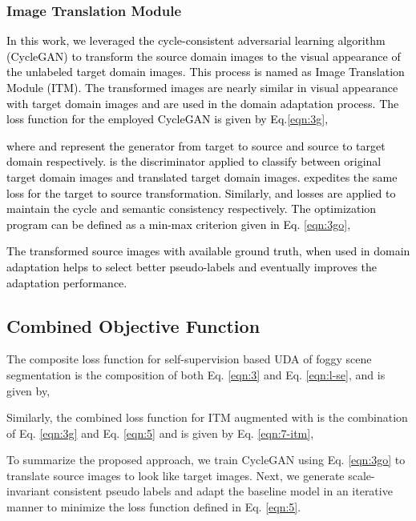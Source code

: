 \documentclass[final,5p,times,twocolumn]{elsarticle}
\begin{document}
\subsubsection{Image Translation Module}
\textcolor{black}{
In this work, we leveraged the cycle-consistent adversarial learning algorithm (CycleGAN) \cite{hoffman2017cycada} to transform the source domain images to the visual appearance of the unlabeled target domain images. This process is named as Image Translation Module (ITM). The transformed images are nearly similar in visual appearance with target domain images and are used in the domain adaptation process. 
The loss function for the employed CycleGAN is given by Eq.\ref{eqn:3g},

where  and  represent the generator from target to source and source to target domain respectively.  is the discriminator applied to classify between original target domain images and translated target domain images.  expedites the same loss for the target to source transformation. Similarly,  and  losses are applied to maintain the cycle and semantic consistency respectively. The optimization program can be defined as a min-max criterion given in Eq. \ref{eqn:3go},

The transformed source images with available ground truth, when used in domain adaptation helps to select better pseudo-labels and eventually improves the adaptation performance.}
\subsection{Combined Objective Function}

The composite loss function for self-supervision based UDA of foggy scene segmentation is the composition of both Eq. \ref{eqn:3} and Eq. \ref{eqn:l-se}, and is given by,  


Similarly, the combined loss function for ITM augmented with  is the combination of Eq. \ref{eqn:3g} and Eq. \ref{eqn:5}
and is given by Eq. \ref{eqn:7-itm},

To summarize the proposed approach, we train CycleGAN using Eq. \ref{eqn:3go} to translate source images to look like target images. Next, we generate scale-invariant consistent pseudo labels and adapt the baseline model in an iterative manner to minimize the loss function  defined in Eq. \ref{eqn:5}.  
\end{document}
